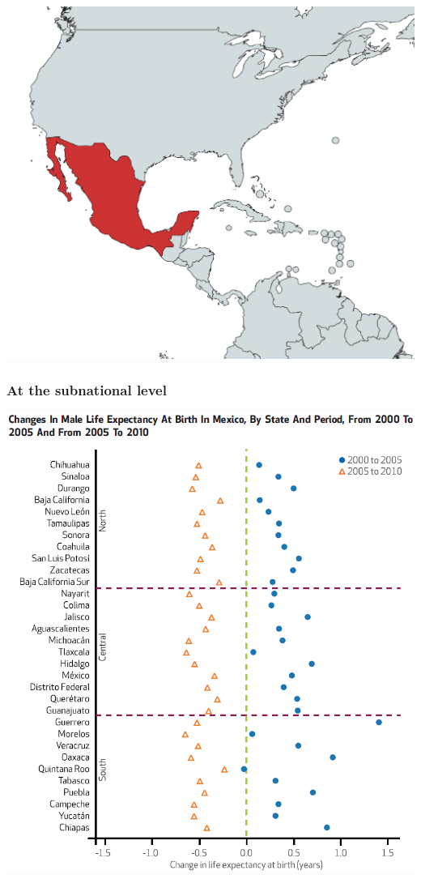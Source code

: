 \documentclass[xcolor={dvipsnames}]{beamer}
\begin{document}
\begin{frame}

				\begin{center}
		\includegraphics[scale=.3]{Figures/Mexico1}
				\end{center}
				
\end{frame}




\begin{frame}\frametitle{At the subnational level}


				\begin{center}
		\includegraphics[scale=.37]{Figures/State_changes_e0}
				\end{center}
				
\end{frame}
\end{document}
